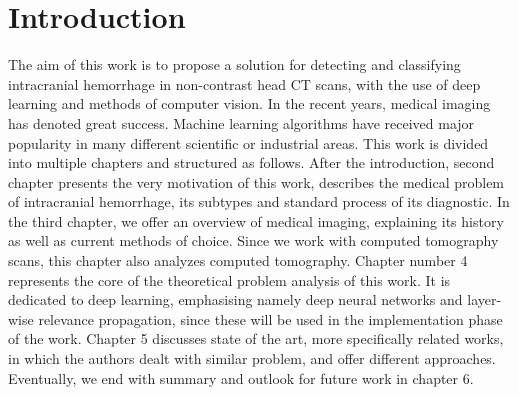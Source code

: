 \chapter{Introduction}

The aim of this work is to propose a solution for detecting and classifying intracranial hemorrhage in non-contrast head CT scans, with the use of deep learning and methods of computer vision. 
In the recent years, medical imaging has denoted great success.
Machine learning algorithms have received major popularity in many different scientific or industrial areas.  
This work is divided into multiple chapters and structured as follows. After the introduction, second chapter presents the very motivation of this work, describes the medical problem of intracranial hemorrhage, its subtypes and standard process of its diagnostic. In the third chapter, we offer an overview of medical imaging, explaining its history as well as current methods of choice. Since we work with computed tomography scans, this chapter also analyzes computed tomography. Chapter number 4 represents the core of the theoretical problem analysis of this work. It is dedicated to deep learning, emphasising namely deep neural networks and layer-wise relevance propagation, since these will be used in the implementation phase of the work. Chapter 5 discusses state of the art, more specifically related works, in which the authors dealt with similar problem, and offer different approaches. Eventually, we end with summary and outlook for future work in chapter 6.
